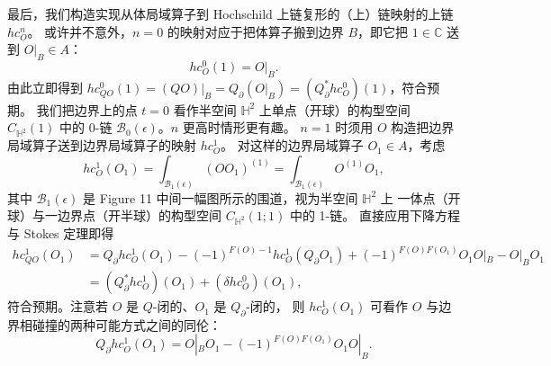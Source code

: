 最后，我们构造实现从体局域算子到 Hochschild 上链复形的（上）链映射的上链 $hc^n_O$。
或许并不意外，$n=0$ 的映射对应于把体算子搬到边界 $B$，即它把 $1\in\mathbb{C}$ 送到 $O|_B\in A$：
\begin{equation}\tag{3.40}
hc^0_O(1) = O|_B .
\end{equation}
由此立即得到 $hc^0_{QO}(1) = (QO)|_B = Q_\partial(O|_B) = (Q^*_\partial hc^0_O)(1)$，符合预期。
我们把边界上的点 $t=0$ 看作半空间 $\mathbb{H}^2$ 上单点（开球）的构型空间
$C_{\mathbb{H}^2}(1)$ 中的 0-链 $\mathcal{B}_0(\epsilon)$。$n$ 更高时情形更有趣。
$n=1$ 时须用 $O$ 构造把边界局域算子送到边界局域算子的映射 $hc^1_O$。
对这样的边界局域算子 $O_1\in A$，考虑
\begin{equation}\tag{3.41}
hc^1_O(O_1) = \int_{\mathcal{B}_1(\epsilon)}(OO_1)^{(1)} = \int_{\mathcal{B}_1(\epsilon)}O^{(1)}O_1 ,
\end{equation}
其中 $\mathcal{B}_1(\epsilon)$ 是 Figure 11 中间一幅图所示的围道，视为半空间 $\mathbb{H}^2$ 上
一体点（开球）与一边界点（开半球）的构型空间 $C_{\mathbb{H}^2}(1;1)$ 中的 1-链。
直接应用下降方程与 Stokes 定理即得
\begin{equation}\tag{3.42}
\begin{aligned}
hc^1_{QO}(O_1) &= Q_\partial hc^1_O(O_1) - (-1)^{F(O)-1}hc^1_O(Q_\partial O_1)
+ (-1)^{F(O)F(O_1)}O_1O|_B - O|_BO_1 \\
&= (Q^*_\partial hc^1_O)(O_1) + (\delta hc^0_O)(O_1) ,
\end{aligned}
\end{equation}
符合预期。注意若 $O$ 是 $Q$-闭的、$O_1$ 是 $Q_\partial$-闭的，
则 $hc^1_O(O_1)$ 可看作 $O$ 与边界相碰撞的两种可能方式之间的同伦：
\begin{equation}\tag{3.43}
Q_\partial hc^1_O(O_1) = O|_BO_1 - (-1)^{F(O)F(O_1)}O_1O|_B .
\end{equation}

